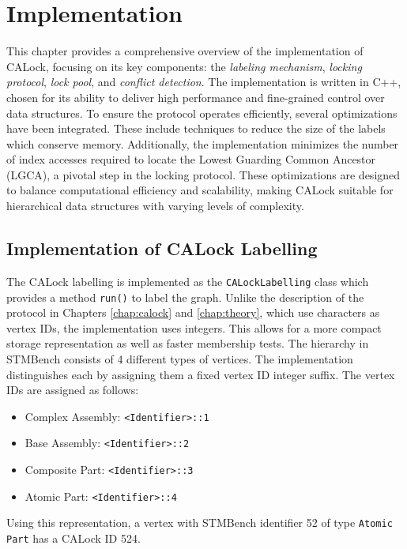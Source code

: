 \chapter{Implementation}
\label{chap:implementation}

\minitoc

This chapter provides a comprehensive overview of the implementation of CALock, focusing on its key components: the \emph{labeling mechanism}, \emph{locking protocol}, \emph{lock pool}, and \emph{conflict detection}. The implementation is written in C++, chosen for its ability to deliver high performance and fine-grained control over data structures. 
To ensure the protocol operates efficiently, several optimizations have been integrated. These include techniques to reduce the size of the labels which conserve memory. Additionally, the implementation minimizes the number of index accesses required to locate the Lowest Guarding Common Ancestor (LGCA), a pivotal step in the locking protocol. These optimizations are designed to balance computational efficiency and scalability, making CALock suitable for hierarchical data structures with varying levels of complexity.


\section{Implementation of CALock Labelling}
\label{sec:calock-labelling}
The CALock labelling is implemented as the \texttt{CALockLabelling} class which provides a method \texttt{run()} to label the graph. Unlike the description of the protocol in Chapters \ref{chap:calock} and \ref{chap:theory}, which use characters as vertex IDs, the implementation uses integers. This allows for a more compact storage representation as well as faster membership tests. The hierarchy in STMBench consists of 4 different types of vertices. The implementation distinguishes each by assigning them a fixed vertex ID integer suffix. The vertex IDs are assigned as follows:

\begin{itemize}
    \item Complex Assembly: \texttt{<Identifier>::1}
    \item Base Assembly: \texttt{<Identifier>::2}
    \item Composite Part: \texttt{<Identifier>::3}
    \item Atomic Part: \texttt{<Identifier>::4}
\end{itemize}

Using this representation, a vertex with STMBench identifier 52 of type \texttt{Atomic Part} has a CALock ID 524.

